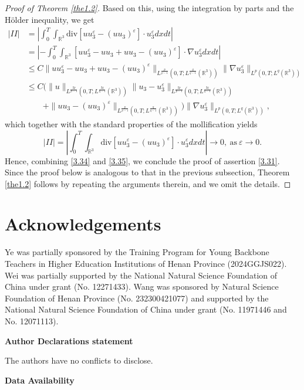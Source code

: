 \documentclass[11pt]{article}
\theoremstyle{plain}\newtheorem{definition}{Definition}[section]
\theoremstyle{definition}\newtheorem{theorem}{Theorem}[section]
\theoremstyle{plain}\newtheorem{lemma}[theorem]{Lemma}
\theoremstyle{plain}\newtheorem{coro}[theorem]{Corollary}
\theoremstyle{plain}\newtheorem{prop}[theorem]{Proposition}
\theoremstyle{remark}\newtheorem{remark}{Remark}[section]
\newcommand{\B}{\Big}
\newcommand{\s}{\mathrm{div}}
\newcommand{\be}{\begin{equation}}
\newcommand{\ee}{\end{equation}}
\newcommand{\ba}{\begin{aligned}}
\newcommand{\ea}{\end{aligned}}
\newcommand{\f}{\frac}
\numberwithin{equation}{section}
\begin{document}
\begin{proof}[Proof of Theorem \ref{the1.2}]
Based on this, using the integration by parts and the H\"older inequality, we get
\be\label{3.35}\ba
|II|&= |\int_0^T\int_{\mathbb{R}^3}\s [uu_3^\varepsilon-(u u_3)^\varepsilon]\cdot u_3^\varepsilon dxdt|\\
&=|-\int_0^T\int_{\mathbb{R}^3} [uu_3^\varepsilon-u u_3+ u u_3-(u u_3)^\varepsilon]\cdot \nabla u_3^\varepsilon dxdt|\\
&\leq C\|uu_3^\varepsilon-u u_3+ u u_3-(u u_3)^\varepsilon\|_{L^{\f{p}{p-1}}(0,T;L^{\f{q}{q-1}}(\mathbb{R}^3))}\|\nabla u_3^\varepsilon \|_{L^{p}(0,T;L^{q}(\mathbb{R}^3))}\\
&\leq C\B( \|u\|_{L^{\f{2p}{p-1}}(0,T;L^{\f{2q}{q-1}}(\mathbb{R}^3))}\|u_3-u_3^\varepsilon\|_{L^{\f{2p}{p-1}}(0,T;L^{\f{2q}{q-1}}(\mathbb{R}^3))}\\
&~~~~~~~~~+\| u u_3 -(u u_3)^\varepsilon \|_{L^{\f{p}{p-1}}(0,T;L^{\f{q}{q-1}}(\mathbb{R}^3))}\B)\|\nabla u_3^\varepsilon \|_{L^{p}(0,T;L^{q}(\mathbb{R}^3))},
\ea\ee
which together with the standard properties of the mollification yields
\be\label{3.36}
|II|= |\int_0^T\int_{\mathbb{R}^3}\s [uu_3^\varepsilon-(u u_3)^\varepsilon]\cdot u_3^\varepsilon dxdt| \to 0, ~\text{as}~\varepsilon \to 0.\ee
Hence, combining \eqref{3.34} and \eqref{3.35}, we conclude the proof of assertion \eqref{3.31}.  Since the proof below is analogous to that in the previous subsection, Theorem \ref{the1.2} follows by repeating the arguments therein, and we omit the details.
\end{proof}

\section*{Acknowledgements}
  Ye was
 partially sponsored by the Training Program for Young Backbone Teachers in
 Higher Education Institutions of Henan Province (2024GGJS022). Wei was partially supported by the National Natural Science Foundation of China under grant (No. 12271433). Wang was sponsored by Natural Science Foundation of
Henan Province (No. 232300421077)  and supported by  the National Natural
Science Foundation of China under grant (No. 11971446 and No. 12071113).


{\bf Author Declarations statement}

The authors have no conflicts to disclose.


{\bf Data Availability}
\end{document}
